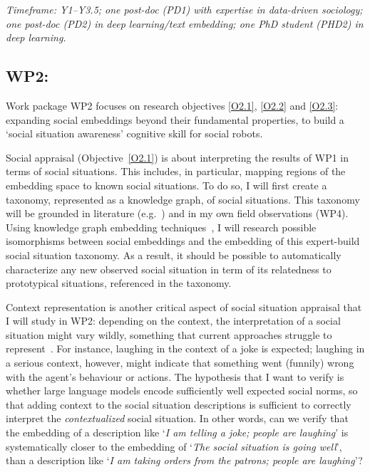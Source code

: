 \vspace{1em}
\noindent\emph{ Timeframe: Y1--Y3.5; one post-doc (PD1) with expertise in
data-driven sociology; one post-doc (PD2) in deep learning/text embedding; one
PhD student (PHD2) in deep learning.}


\subsection{WP2: \textbf{\WPB}} 

Work package WP2 focuses on research objectives \ref{O2.1}, \ref{O2.2} and \ref{O2.3}:
expanding social embeddings beyond their fundamental properties, to build a
`social situation awareness' cognitive skill for social robots.





Social appraisal (Objective~\ref{O2.1}) is about interpreting the results of WP1
in terms of social situations. This includes, in particular, mapping regions of
the embedding space to known social situations. To do so, I will first create a
taxonomy, represented as a knowledge graph, of social situations. This taxonomy
will be grounded in literature (e.g.~\cite{kelley2003atlas}) and in my own field
observations (WP4).  Using knowledge graph embedding
techniques~\cite{ji2022survey}, I will research possible isomorphisms between
social embeddings and the embedding of this expert-build social situation
taxonomy. As a result, it should be possible to automatically characterize any
new observed social situation in term of its relatedness to prototypical
situations, referenced in the taxonomy.

Context representation is another critical aspect of social situation appraisal
that I will study in WP2: depending on the context, the interpretation of a
social situation might vary wildly, something that current approaches struggle
to represent~\cite{yang2018grand}. For instance, laughing in the context of a
joke is expected; laughing in a serious context, however, might indicate that
something went (funnily) wrong with the agent's behaviour or actions. The
hypothesis that I want to verify is whether large language models encode
sufficiently well expected social norms, so that adding context to the social
situation descriptions is sufficient to correctly interpret the
\emph{contextualized} social situation. In other words, can we verify that the
embedding of a description like `\emph{I am telling a joke; people are
laughing}' is systematically closer to the embedding of `\emph{The social
situation is going well}', than a description like `\emph{I am taking orders
from the patrons; people are laughing}'?

